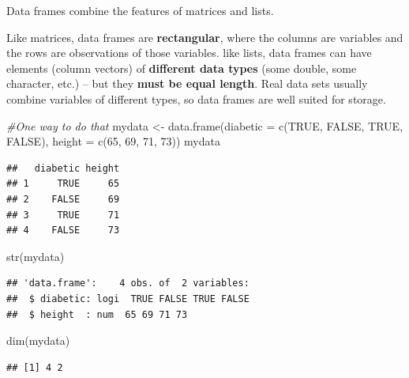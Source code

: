 \documentclass[
]{book}
\newenvironment{Shaded}{\begin{snugshade}}{\end{snugshade}}
\newcommand{\AttributeTok}[1]{\textcolor[rgb]{0.77,0.63,0.00}{#1}}
\newcommand{\CommentTok}[1]{\textcolor[rgb]{0.56,0.35,0.01}{\textit{#1}}}
\newcommand{\ConstantTok}[1]{\textcolor[rgb]{0.00,0.00,0.00}{#1}}
\newcommand{\DecValTok}[1]{\textcolor[rgb]{0.00,0.00,0.81}{#1}}
\newcommand{\FunctionTok}[1]{\textcolor[rgb]{0.00,0.00,0.00}{#1}}
\newcommand{\NormalTok}[1]{#1}
\newcommand{\OtherTok}[1]{\textcolor[rgb]{0.56,0.35,0.01}{#1}}
\theoremstyle{definition}
\theoremstyle{definition}
\theoremstyle{definition}
\theoremstyle{definition}
\theoremstyle{remark}
\begin{document}
Data frames combine the features of matrices and lists.

Like matrices, data frames are \textbf{rectangular}, where the columns are variables and the rows are observations of those variables. like lists, data frames can have elements (column vectors) of \textbf{different data types} (some double, some character, etc.) -- but they \textbf{must be equal length}. Real data sets usually combine variables of different types, so data frames are well suited for storage.

\begin{Shaded}
\begin{Highlighting}[]
\CommentTok{\#One way to do that}
\NormalTok{mydata }\OtherTok{\textless{}{-}} \FunctionTok{data.frame}\NormalTok{(}\AttributeTok{diabetic =} \FunctionTok{c}\NormalTok{(}\ConstantTok{TRUE}\NormalTok{, }\ConstantTok{FALSE}\NormalTok{, }\ConstantTok{TRUE}\NormalTok{, }\ConstantTok{FALSE}\NormalTok{), }
                     \AttributeTok{height =} \FunctionTok{c}\NormalTok{(}\DecValTok{65}\NormalTok{, }\DecValTok{69}\NormalTok{, }\DecValTok{71}\NormalTok{, }\DecValTok{73}\NormalTok{))}
\NormalTok{mydata}
\end{Highlighting}
\end{Shaded}

\begin{verbatim}
##   diabetic height
## 1     TRUE     65
## 2    FALSE     69
## 3     TRUE     71
## 4    FALSE     73
\end{verbatim}

\begin{Shaded}
\begin{Highlighting}[]
\FunctionTok{str}\NormalTok{(mydata)}
\end{Highlighting}
\end{Shaded}

\begin{verbatim}
## 'data.frame':    4 obs. of  2 variables:
##  $ diabetic: logi  TRUE FALSE TRUE FALSE
##  $ height  : num  65 69 71 73
\end{verbatim}

\begin{Shaded}
\begin{Highlighting}[]
\FunctionTok{dim}\NormalTok{(mydata)}
\end{Highlighting}
\end{Shaded}

\begin{verbatim}
## [1] 4 2
\end{verbatim}
\end{document}
